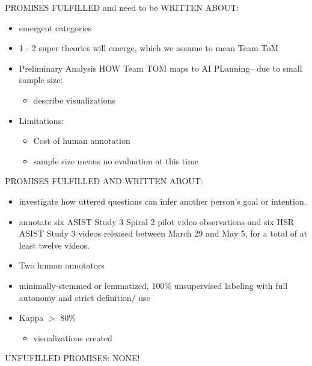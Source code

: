 \documentclass[10pt]{article}
\begin{document}
 PROMISES FULFILLED and need to be WRITTEN ABOUT:
\begin{itemize}
    \item emergent categories
    \item 1 - 2 super theories will emerge, which we assume to mean Team ToM
    \item Preliminary Analysis HOW Team TOM maps to AI PLanning-- due to small sample size:
    \begin{itemize}
        \item describe visualizations
    \end{itemize}
    \item Limitations:
    \begin{itemize}
        \item Cost of human annotation
        \item sample size means no evaluation at this time
    \end{itemize}
 \end{itemize}
 
 
PROMISES FULFILLED AND WRITTEN ABOUT:
\begin{itemize}
    \item investigate how uttered questions can infer another person's goal or intention. 
    \item  annotate six ASIST Study 3 Spiral 2 pilot video observations and
six HSR ASIST Study 3 videos released between March 29 and May 5, for a total
of at least twelve videos. 
    \item Two human annotators
    \item minimally-stemmed or lemmatized, 100\% unsupervised labeling with full autonomy and strict definition/ use
    \item Kappa $>$ 80\%
    \begin{itemize}
        \item visualizations created
    \end{itemize}
 \end{itemize}
 
 UNFUFILLED PROMISES:
 NONE!
 
\end{document}
